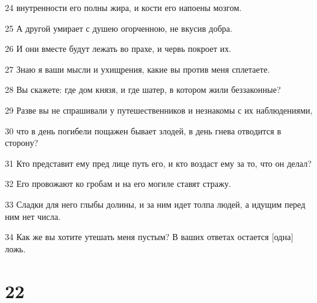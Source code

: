 \par 24 внутренности его полны жира, и кости его напоены мозгом.
\par 25 А другой умирает с душею огорченною, не вкусив добра.
\par 26 И они вместе будут лежать во прахе, и червь покроет их.
\par 27 Знаю я ваши мысли и ухищрения, какие вы против меня сплетаете.
\par 28 Вы скажете: где дом князя, и где шатер, в котором жили беззаконные?
\par 29 Разве вы не спрашивали у путешественников и незнакомы с их наблюдениями,
\par 30 что в день погибели пощажен бывает злодей, в день гнева отводится в сторону?
\par 31 Кто представит ему пред лице путь его, и кто воздаст ему за то, что он делал?
\par 32 Его провожают ко гробам и на его могиле ставят стражу.
\par 33 Сладки для него глыбы долины, и за ним идет толпа людей, а идущим перед ним нет числа.
\par 34 Как же вы хотите утешать меня пустым? В ваших ответах остается [одна] ложь.

\chapter{22}

